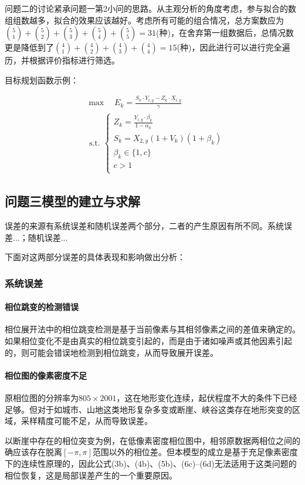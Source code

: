 \documentclass[a4paper]{article}
\begin{document}
	问题二的讨论紧承问题一第2小问的思路。从主观分析的角度考虑，参与拟合的数组组数越多，拟合的效果应该越好。考虑所有可能的组合情况，总方案数应为$ \binom{5}{1} + \binom{5}{2} + \binom{5}{3} + \binom{5}{4} + \binom{5}{5} = 31 $(种)，在舍弃第一组数据后，总情况数更是降低到了$ \binom{4}{1} + \binom{4}{2} + \binom{4}{3} + \binom{4}{4} = 15 $(种)，因此进行可以进行完全遍历，并根据评价指标进行筛选。
	
	目标规划函数示例：
	
	\begin{equation}
		\begin{aligned}
			& \max \quad E_k=\frac{S_k \cdot Y_{i, y}-Z_k \cdot X_{i, y}}{\gamma} \\
			& \text { s.t. }\left\{\begin{array}{l}
				Z_k=\frac{Y_{i, y} \cdot \beta_k}{1-\alpha_k} \\
				S_k=X_{2, y}\left(1+V_k\right)\left(1+\beta_k\right) \\
				\beta_k \in\{1, c\} \\
				c>1 \\
 
			\end{array}\right.
		\end{aligned}
	\end{equation}
	
	\subsection{问题三模型的建立与求解}

	误差的来源有系统误差和随机误差两个部分，二者的产生原因有所不同。系统误差...；随机误差...\par
	下面对这两部分误差的具体表现和影响做出分析：\par
	
	\subsubsection{系统误差}

	\paragraph{相位跳变的检测错误}
	相位展开法中的相位跳变检测是基于当前像素与其相邻像素之间的差值来确定的。如果相位变化不是由真实的相位跳变引起的，而是由于诸如噪声或其他因素引起的，则可能会错误地检测到相位跳变，从而导致展开误差。\par

	\paragraph{相位图的像素密度不足}
	原相位图的分辨率为$ 805 \times 2001 $，这在地形变化连续，起伏程度不大的条件下已经足够。但对于如城市、山地这类地形复杂多变或断崖、峡谷这类存在地形突变的区域，采样精度可能不足，从而导致误差。\par
	以断崖中存在的相位突变为例，在低像素密度相位图中，相邻原数据两相位之间的确应该存在脱离$ [-\pi,\pi] $范围以外的相位差。但本模型的成立是基于充足像素密度下的连续性原理的，因此公式(3b)、(4b)、(5b)、(6c)--(6d)无法适用于这类问题的相位恢复，这是局部误差产生的一个重要原因。\par
\end{document}
